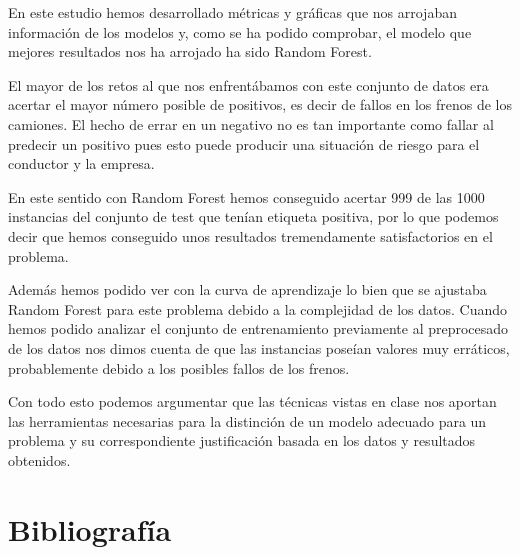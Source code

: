 En este estudio hemos desarrollado métricas y gráficas que nos arrojaban información de los modelos y, como se ha podido comprobar, el modelo que mejores resultados nos ha arrojado ha sido Random Forest. 

El mayor de los retos al que nos enfrentábamos con este conjunto de datos era acertar el mayor número posible de positivos, es decir de fallos en los frenos de los camiones. El hecho de errar en un negativo no es tan importante como fallar al predecir un positivo pues esto puede producir una situación de riesgo para el conductor y la empresa.

En este sentido con Random Forest hemos conseguido acertar 999 de las 1000 instancias del conjunto de test que tenían etiqueta positiva, por lo que podemos decir que hemos conseguido unos resultados tremendamente satisfactorios en el problema.

Además hemos podido ver con la curva de aprendizaje lo bien que se ajustaba Random Forest para este problema debido a la complejidad de los datos. Cuando hemos podido analizar el conjunto de entrenamiento previamente al preprocesado de los datos nos dimos cuenta de que las instancias poseían valores muy erráticos, probablemente debido a los posibles fallos de los frenos. 

Con todo esto podemos argumentar que las técnicas vistas en clase nos aportan las herramientas necesarias para la distinción de un modelo adecuado para un problema y su correspondiente justificación basada en los datos y resultados obtenidos.

\newpage
\section{Bibliografía}




